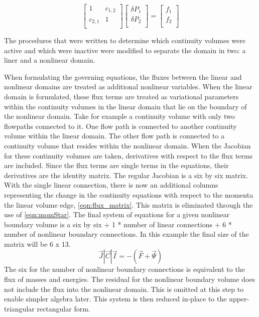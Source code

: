   \begin{equation}
\label{eqn:domainDecomp5}
 \begin{bmatrix} 
1 & c_{1,2}  \\
c_{2,1} & 1 \\
 \end{bmatrix} \begin{bmatrix}
 \delta P_{1} \\
 \delta P_{2} \\
\end{bmatrix}  = \begin{bmatrix}
 f_1 \\
 f_2 \\
\end{bmatrix}
 \end{equation}
 

The procedures that were written to determine which continuity volumes were active and which were inactive were modified to separate the domain in two: a liner and a nonlinear domain.

When formulating the governing equations, the fluxes between the linear and nonlinear domains are treated as additional nonlinear variables.
When the linear domain is formulated, these flux terms are treated as variational parameters within the continuity volumes in the linear domain that lie on the boundary of the nonlinear domain.
Take for example a continuity volume with only two flowpaths connected to it.
One flow path is connected to another continuity volume within the linear domain.
The other flow path is connected to a continuity volume that resides within the nonlinear domain.
When the Jacobian for these continuity volumes are taken, derivatives with respect to the flux terms are included.
Since the flux terms are single terms in the equations, their derivatives are the identity matrix.
The regular Jacobian is a six by six matrix.
With the single linear connection, there is now an additional columns representing the change in the continuity equations with respect to the momenta the linear volume edge, \eqref{eqn:flux_matrix}.
This matrix is eliminated through the use of \eqref{eqn:momStar}.
The final system of equations for a given nonlinear boundary volume is a six by six + 1 * number of linear connections + 6 * number of nonlinear boundary connections.
In this example the final size of the matrix will be 6 x 13.
\begin{equation}
\vec{J}|\vec{C}|\vec{I} = -(\vec{F} + \vec{\Psi})
\end{equation}
The six for the number of nonlinear boundary connections is equivalent to the flux of masses and energies.
The residual for the nonlinear boundary volume does not include the flux into the nonlinear domain.
This is omitted at this step to enable simpler algebra later.
This system is then reduced in-place to the upper-triangular rectangular form. 

